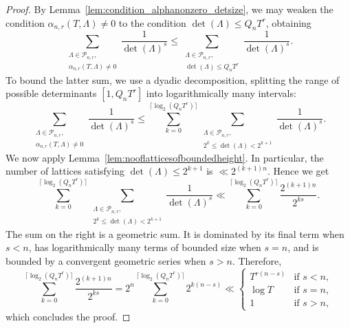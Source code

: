 \documentclass[11pt,reqno]{amsart}
\theoremstyle{definition}
\theoremstyle{remark}
\numberwithin{equation}{section}
\numberwithin{thm}{section}
\numberwithin{table}{section}
\begin{document}
\begin{proof}
By Lemma~\ref{lem:condition_alphanonzero_detsize}, we may weaken the condition
$\alpha_{n,r}(T,\Lambda)\ne0$ to the condition
$\det(\Lambda)\le Q_nT^r$, obtaining
\begin{equation*}
    \sum_{\substack{\Lambda \in \mathcal{P}_{n,r}, \\
    \alpha_{n,r}(T,\Lambda) \neq 0}}
    \frac{1}{\det(\Lambda)^s}
    \le
    \sum_{\substack{\Lambda \in \mathcal{P}_{n,r}, \\
    \det(\Lambda) \le Q_n T^r}}
    \frac{1}{\det(\Lambda)^s}.
\end{equation*}
To bound the latter sum, we use a dyadic decomposition, splitting the
range of possible determinants $[1,Q_nT^r]$ into logarithmically many
intervals:
\begin{equation*}
    \sum_{\substack{\Lambda \in \mathcal{P}_{n,r}, \\
    \alpha_{n,r}(T,\Lambda) \neq 0}}
    \frac{1}{\det(\Lambda)^s}
    \le
    \sum_{k = 0}^{\lceil \log_2(Q_n T^r) \rceil}\!\!\!
    \sum_{\substack{\Lambda \in \mathcal{P}_{n,r}, \\
    2^k \le \det(\Lambda) < 2^{k + 1}}}\!\!\!
    \frac{1}{\det(\Lambda)^s}.
\end{equation*}
We now apply Lemma~\ref{lem:nooflatticesofboundedheight}. In particular,
the number of lattices satisfying $\det(\Lambda)\le 2^{k + 1}$ is
$\ll 2^{(k + 1)n}$. Hence we get
\begin{equation*}
      \sum_{k = 0}^{\lceil \log_2(Q_n T^r) \rceil}\!\!\!
    \sum_{\substack{\Lambda \in \mathcal{P}_{n,r}, \\
    2^k \le \det(\Lambda) < 2^{k + 1}}}\!\!\!
    \frac{1}{\det(\Lambda)^s}
    \ll
    \sum_{k = 0}^{\lceil \log_2(Q_n T^r) \rceil}
    \frac{2^{(k + 1)n}}{2^{ks}}.
\end{equation*}
The sum on the right is a geometric sum. It is dominated by its final
term when $s<n$, has logarithmically many terms of bounded size when
$s=n$, and is bounded by a convergent geometric series when $s>n$.
Therefore,
\begin{equation*}
   \sum_{k = 0}^{\lceil \log_2(Q_n T^r) \rceil}
    \frac{2^{(k + 1)n}}{2^{ks}}
    =
    2^{n}
    \sum_{k = 0}^{\lceil \log_2(Q_n T^r) \rceil}
    2^{k(n-s)}
    \ll
    \begin{cases}
        T^{r(n-s)} & \text{if } s < n,\\
        \log T & \text{if } s = n,\\
        1 & \text{if } s > n,
    \end{cases}
\end{equation*}
which concludes the proof.
\end{proof}
\end{document}
